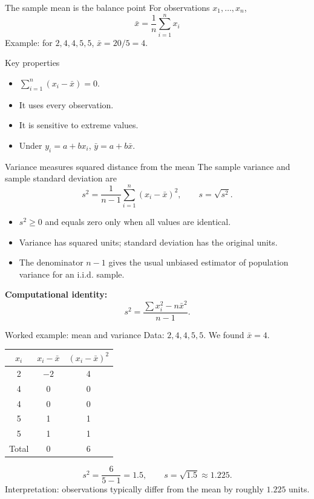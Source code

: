 \documentclass[aspectratio=169,11pt]{beamer}
\begin{document}
\begin{frame}{The sample mean is the balance point}
For observations $x_1,\ldots,x_n$,
\[
\boxed{\bar{x}=\frac{1}{n}\sum_{i=1}^{n}x_i}
\]
Example: for $2,4,4,5,5$, $\bar{x}=20/5=4$.

\medskip
\begin{block}{Key properties}
\begin{itemize}
  \item $\sum_{i=1}^{n}(x_i-\bar{x})=0$.
  \item It uses every observation.
  \item It is sensitive to extreme values.
  \item Under $y_i=a+bx_i$, $\bar{y}=a+b\bar{x}$.
\end{itemize}
\end{block}
\end{frame}

\begin{frame}{Variance measures squared distance from the mean}
The sample variance and sample standard deviation are
\[
\boxed{s^2=\frac{1}{n-1}\sum_{i=1}^{n}(x_i-\bar{x})^2},\qquad \boxed{s=\sqrt{s^2}}.
\]
\begin{itemize}
  \item $s^2\ge 0$ and equals zero only when all values are identical.
  \item Variance has squared units; standard deviation has the original units.
  \item The denominator $n-1$ gives the usual unbiased estimator of population variance for an i.i.d. sample.
\end{itemize}
\textbf{Computational identity:}
\[
s^2=\frac{\sum x_i^2-n\bar{x}^{2}}{n-1}.
\]
\end{frame}

\begin{frame}{Worked example: mean and variance}
Data: $2,4,4,5,5$. We found $\bar{x}=4$.
\begin{center}
\begin{tabular}{c@{\qquad}c@{\qquad}c}
\toprule
$x_i$ & $x_i-\bar{x}$ & $(x_i-\bar{x})^2$\\
\midrule
2 & $-2$ & 4\\
4 & 0 & 0\\
4 & 0 & 0\\
5 & 1 & 1\\
5 & 1 & 1\\
\midrule
Total & 0 & 6\\
\bottomrule
\end{tabular}
\end{center}
\[
s^2=\frac{6}{5-1}=1.5,\qquad s=\sqrt{1.5}\approx1.225.
\]
Interpretation: observations typically differ from the mean by roughly $1.225$ units.
\end{frame}
\end{document}
